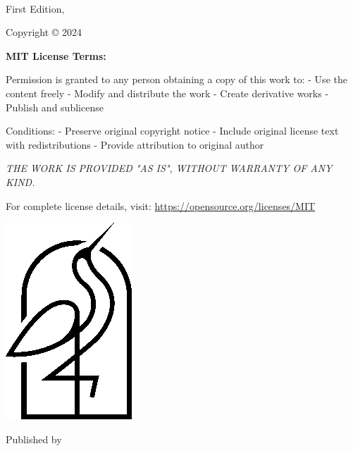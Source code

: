 {\small
\setlength{\parindent}{0em}\setlength{\parskip}{1em}
~
\vfill

First Edition, \editionyear{}

Copyright \copyright{} 2024 \authorname

{\bfseries MIT License Terms:}

Permission is granted to any person obtaining a copy of this work to:
- Use the content freely
- Modify and distribute the work
- Create derivative works
- Publish and sublicense

Conditions:
- Preserve original copyright notice
- Include original license text with redistributions
- Provide attribution to original author

{\itshape THE WORK IS PROVIDED "AS IS", WITHOUT WARRANTY OF ANY KIND.}

For complete license details, visit:
\url{https://opensource.org/licenses/MIT}

\ifx\isbn\undefined\else\if\relax\detokenize\expandafter{\isbn}\relax{}\fi\fi

\includegraphics[width=0.07\linewidth]{frontmatter/logo-black.png}

Published by \publisher{}
}
